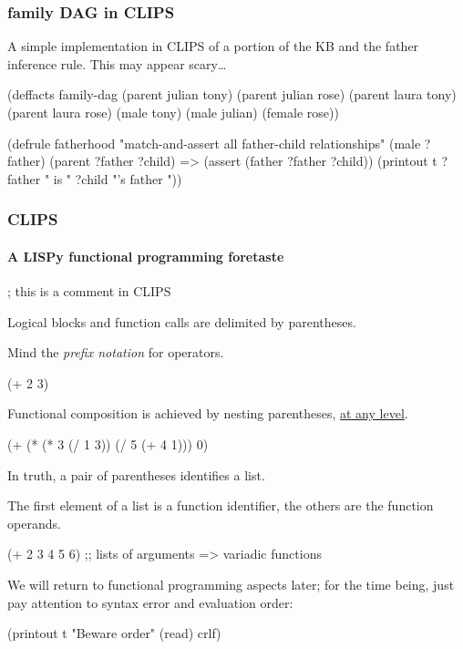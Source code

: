 \documentclass[xcolor={usenames,dvipsnames,svgnames}, compress]{beamer}
\begin{document}
\begin{frame}[fragile]
  \frametitle{family DAG in CLIPS}

  A simple implementation in CLIPS of a portion of the KB and the father
  inference rule. This may appear scary\dots
  \begin{clips-code}
    (deffacts family-dag
        (parent julian tony)
        (parent julian rose)
        (parent laura tony)
        (parent laura rose)
        (male tony)
        (male julian)
        (female rose))
        
    (defrule fatherhood
    "match-and-assert all father-child relationships"
        (male ?father)
        (parent ?father ?child)
        =>
        (assert (father ?father ?child))
        (printout t ?father " is " ?child "'s father "))
        
  \end{clips-code}
\end{frame}

\begin{frame}[fragile]
  \frametitle{CLIPS}
  \framesubtitle{A LISPy functional programming foretaste}
  \begin{clips-code}[numbers=none]
    ; this is a comment in CLIPS
  \end{clips-code}
  Logical blocks and function calls are delimited by parentheses.\par
  Mind the \emph{prefix notation} for operators.
  \begin{clips-code}[numbers=none]
    (+ 2 3)
  \end{clips-code}
  
  Functional composition is achieved by nesting parentheses, \href{http://c2.com/cgi/wiki?LostInaSeaofParentheses}{at any
  level}. 
  \begin{clips-code}[numbers=none]
    (+ (* (* 3 (/ 1 3)) (/ 5 (+ 4 1))) 0)
  \end{clips-code}
  In truth, a pair of parentheses identifies a list.\par
  The first element of a list is a function identifier, the others are
  the function operands.\par
  
  \begin{clips-code}[numbers=none]
    (+ 2 3 4 5 6) ;; lists of arguments => variadic functions
  \end{clips-code}

  We will return to functional programming aspects later; for the time
  being, just pay attention to syntax error and evaluation order:
  \begin{clips-code}[numbers=none]
    (printout t "Beware order" (read) crlf)
  \end{clips-code}
\end{frame}
\end{document}
